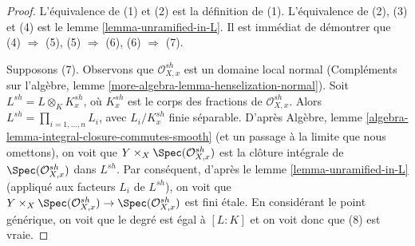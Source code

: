 \begin{proof}
L'équivalence de (1) et (2) est la définition de (1).
L'équivalence de (2), (3) et (4) est le lemme \ref{lemma-unramified-in-L}.
Il est immédiat de démontrer que (4) $\Rightarrow$ (5),
(5) $\Rightarrow$ (6), (6) $\Rightarrow$ (7).

\medskip\noindent
Supposons (7). Observons que $\mathcal{O}_{X, x}^{sh}$ est un domaine local normal
(Compléments sur l'algèbre, lemme \ref{more-algebra-lemma-henselization-normal}).
Soit $L^{sh} = L \otimes_K K_x^{sh}$, où $K_x^{sh}$ est le corps des fractions
de $\mathcal{O}_{X, x}^{sh}$. Alors $L^{sh} = \prod_{i = 1, \ldots, n} L_i$,
avec $L_i/K_x^{sh}$ finie séparable. D'après
Algèbre, lemme \ref{algebra-lemma-integral-closure-commutes-smooth}
(et un passage à la limite que nous omettons),
on voit que $Y \times_X \Spec(\mathcal{O}_{X, x}^{sh})$
est la clôture intégrale de $\Spec(\mathcal{O}_{X, x}^{sh})$ dans $L^{sh}$.
Par conséquent, d'après le lemme \ref{lemma-unramified-in-L} (appliqué aux facteurs
$L_i$ de $L^{sh}$), on voit que
$Y \times_X \Spec(\mathcal{O}_{X, x}^{sh}) \to \Spec(\mathcal{O}_{X, x}^{sh})$
est fini étale. En considérant le point générique, on voit que
le degré est égal à $[L : K]$ et on voit donc que (8) est vraie.


\end{proof}
